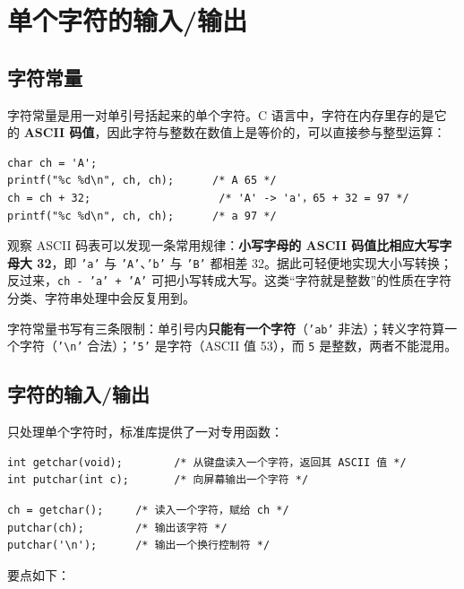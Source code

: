 ﻿%
\lstset{language=C}

\section{单个字符的输入/输出}

\subsection{字符常量}

字符常量是用一对单引号括起来的单个字符。C 语言中，字符在内存里存的是它的 \textbf{ASCII 码值}，因此字符与整数在数值上是等价的，可以直接参与整型运算：

\begin{lstlisting}
char ch = 'A';
printf("%c %d\n", ch, ch);      /* A 65 */
ch = ch + 32;                    /* 'A' -> 'a'，65 + 32 = 97 */
printf("%c %d\n", ch, ch);      /* a 97 */
\end{lstlisting}

观察 ASCII 码表可以发现一条常用规律：\textbf{小写字母的 ASCII 码值比相应大写字母大 32}，即 \texttt{'a'} 与 \texttt{'A'}、\texttt{'b'} 与 \texttt{'B'} 都相差 32。据此可轻便地实现大小写转换；反过来，\texttt{ch - 'a' + 'A'} 可把小写转成大写。这类“字符就是整数”的性质在字符分类、字符串处理中会反复用到。

字符常量书写有三条限制：单引号内\textbf{只能有一个字符}（\texttt{'ab'} 非法）；转义字符算一个字符（\texttt{'\textbackslash n'} 合法）；\texttt{'5'} 是字符（ASCII 值 53），而 \texttt{5} 是整数，两者不能混用。

\subsection{字符的输入/输出}

只处理单个字符时，标准库提供了一对专用函数：

\begin{lstlisting}
int getchar(void);        /* 从键盘读入一个字符，返回其 ASCII 值 */
int putchar(int c);       /* 向屏幕输出一个字符 */
\end{lstlisting}

\begin{lstlisting}
ch = getchar();     /* 读入一个字符，赋给 ch */
putchar(ch);        /* 输出该字符 */
putchar('\n');      /* 输出一个换行控制符 */
\end{lstlisting}

要点如下：

